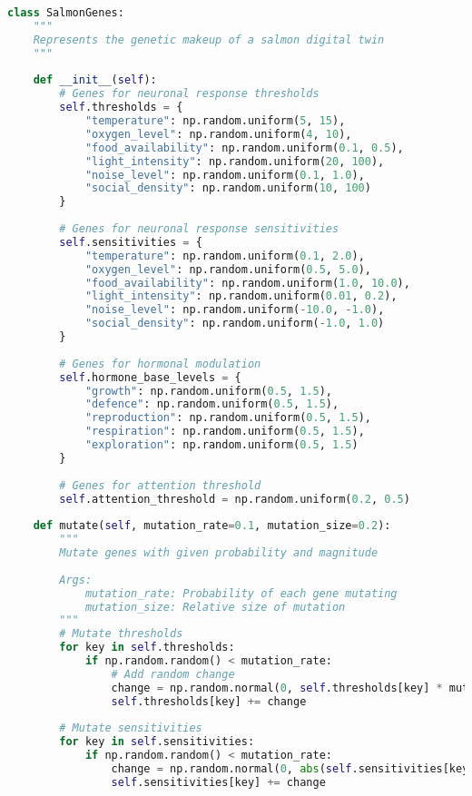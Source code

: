 \documentclass[11pt,a4paper]{article}
\begin{document}
\begin{lstlisting}[language=Python]
class SalmonGenes:
    """
    Represents the genetic makeup of a salmon digital twin
    """
    
    def __init__(self):
        # Genes for neuronal response thresholds
        self.thresholds = {
            "temperature": np.random.uniform(5, 15),
            "oxygen_level": np.random.uniform(4, 10),
            "food_availability": np.random.uniform(0.1, 0.5),
            "light_intensity": np.random.uniform(20, 100),
            "noise_level": np.random.uniform(0.1, 1.0),
            "social_density": np.random.uniform(10, 100)
        }
        
        # Genes for neuronal response sensitivities
        self.sensitivities = {
            "temperature": np.random.uniform(0.1, 2.0),
            "oxygen_level": np.random.uniform(0.5, 5.0),
            "food_availability": np.random.uniform(1.0, 10.0),
            "light_intensity": np.random.uniform(0.01, 0.2),
            "noise_level": np.random.uniform(-10.0, -1.0),
            "social_density": np.random.uniform(-1.0, 1.0)
        }
        
        # Genes for hormonal modulation
        self.hormone_base_levels = {
            "growth": np.random.uniform(0.5, 1.5),
            "defence": np.random.uniform(0.5, 1.5),
            "reproduction": np.random.uniform(0.5, 1.5),
            "respiration": np.random.uniform(0.5, 1.5),
            "exploration": np.random.uniform(0.5, 1.5)
        }
        
        # Genes for attention threshold
        self.attention_threshold = np.random.uniform(0.2, 0.5)
        
    def mutate(self, mutation_rate=0.1, mutation_size=0.2):
        """
        Mutate genes with given probability and magnitude
        
        Args:
            mutation_rate: Probability of each gene mutating
            mutation_size: Relative size of mutation
        """
        # Mutate thresholds
        for key in self.thresholds:
            if np.random.random() < mutation_rate:
                # Add random change
                change = np.random.normal(0, self.thresholds[key] * mutation_size)
                self.thresholds[key] += change
                
        # Mutate sensitivities
        for key in self.sensitivities:
            if np.random.random() < mutation_rate:
                change = np.random.normal(0, abs(self.sensitivities[key]) * mutation_size)
                self.sensitivities[key] += change
                

\end{lstlisting}
\end{document}
